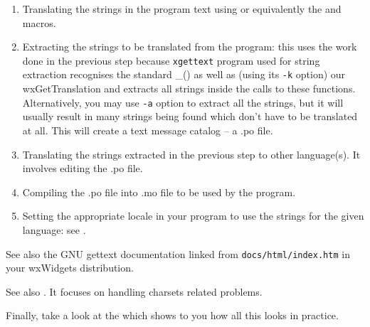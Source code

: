 \begin{enumerate}\itemsep=0pt
\item Translating the strings in the program text using 
 or equivalently the 
 and  macros.
\item Extracting the strings to be translated from the program: this uses the
work done in the previous step because {\tt xgettext} program used for string
extraction recognises the standard \_() as well as (using its {\tt -k} option)
our wxGetTranslation and extracts all strings inside the calls to these
functions. Alternatively, you may use {\tt -a} option to extract all the
strings, but it will usually result in many strings being found which don't
have to be translated at all. This will create a text message catalog -- a .po
file.
\item Translating the strings extracted in the previous step to other
language(s). It involves editing the .po file.
\item Compiling the .po file into .mo file to be used by the program.
\item Setting the appropriate locale in your program to use the strings for the
given language: see .
\end{enumerate}

See also the GNU gettext documentation linked from {\tt docs/html/index.htm} in
your wxWidgets distribution.

See also .
It focuses on handling charsets related problems.

Finally, take a look at the  which shows
to you how all this looks in practice.

